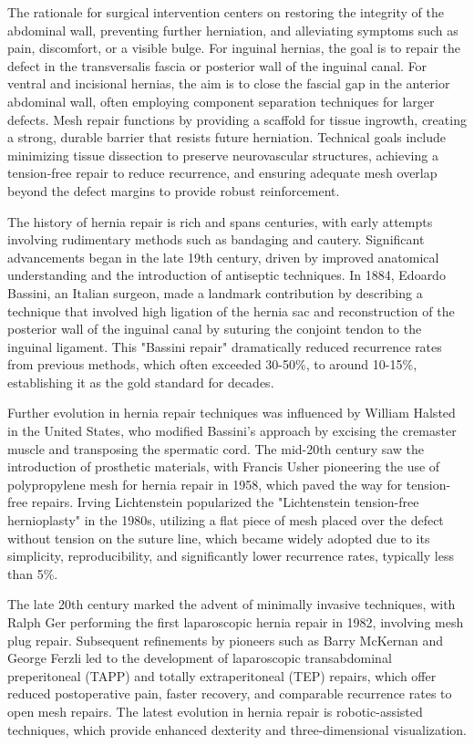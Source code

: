 The rationale for surgical intervention centers on restoring the integrity of the abdominal wall, preventing further herniation, and alleviating symptoms such as pain, discomfort, or a visible bulge. For inguinal hernias, the goal is to repair the defect in the transversalis fascia or posterior wall of the inguinal canal. For ventral and incisional hernias, the aim is to close the fascial gap in the anterior abdominal wall, often employing component separation techniques for larger defects. Mesh repair functions by providing a scaffold for tissue ingrowth, creating a strong, durable barrier that resists future herniation. Technical goals include minimizing tissue dissection to preserve neurovascular structures, achieving a tension-free repair to reduce recurrence, and ensuring adequate mesh overlap beyond the defect margins to provide robust reinforcement.

The history of hernia repair is rich and spans centuries, with early attempts involving rudimentary methods such as bandaging and cautery. Significant advancements began in the late 19th century, driven by improved anatomical understanding and the introduction of antiseptic techniques. In 1884, Edoardo Bassini, an Italian surgeon, made a landmark contribution by describing a technique that involved high ligation of the hernia sac and reconstruction of the posterior wall of the inguinal canal by suturing the conjoint tendon to the inguinal ligament. This "Bassini repair" dramatically reduced recurrence rates from previous methods, which often exceeded 30-50\%, to around 10-15\%, establishing it as the gold standard for decades.

Further evolution in hernia repair techniques was influenced by William Halsted in the United States, who modified Bassini's approach by excising the cremaster muscle and transposing the spermatic cord. The mid-20th century saw the introduction of prosthetic materials, with Francis Usher pioneering the use of polypropylene mesh for hernia repair in 1958, which paved the way for tension-free repairs. Irving Lichtenstein popularized the "Lichtenstein tension-free hernioplasty" in the 1980s, utilizing a flat piece of mesh placed over the defect without tension on the suture line, which became widely adopted due to its simplicity, reproducibility, and significantly lower recurrence rates, typically less than 5\%.

The late 20th century marked the advent of minimally invasive techniques, with Ralph Ger performing the first laparoscopic hernia repair in 1982, involving mesh plug repair. Subsequent refinements by pioneers such as Barry McKernan and George Ferzli led to the development of laparoscopic transabdominal preperitoneal (TAPP) and totally extraperitoneal (TEP) repairs, which offer reduced postoperative pain, faster recovery, and comparable recurrence rates to open mesh repairs. The latest evolution in hernia repair is robotic-assisted techniques, which provide enhanced dexterity and three-dimensional visualization.

